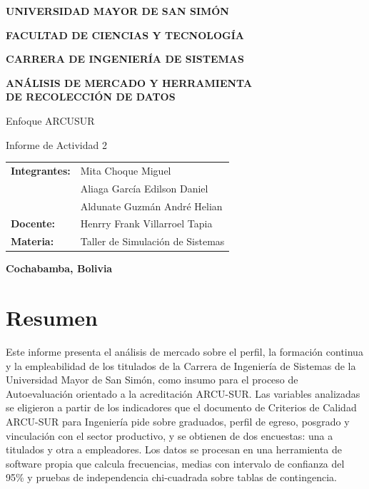 \documentclass[12pt, a4paper]{article}
\begin{document}


\setlength{\parindent}{0pt}

\begin{titlepage}
\centering
{\large\bfseries UNIVERSIDAD MAYOR DE SAN SIMÓN\par}
\vspace{4pt}
{\bfseries FACULTAD DE CIENCIAS Y TECNOLOGÍA\par}
\vspace{4pt}
{\bfseries CARRERA DE INGENIERÍA DE SISTEMAS\par}

\vspace*{\fill}
{\huge\bfseries ANÁLISIS DE MERCADO Y HERRAMIENTA\\DE RECOLECCIÓN DE DATOS\par}
\vspace{0.8cm}
{\Large Enfoque ARCUSUR\par}
\vspace{0.8cm}
{\normalsize Informe de Actividad 2\par}
\vspace*{\fill}

\begin{flushleft}
\begin{tabular}{@{}ll}
\textbf{Integrantes:} & Mita Choque Miguel \\[4pt]
                      & Aliaga García Edilson Daniel \\[4pt]
                      & Aldunate Guzmán André Helian \\[4pt]
\textbf{Docente:}     & Henrry Frank Villarroel Tapia \\[4pt]
\textbf{Materia:}     & Taller de Simulación de Sistemas \\
\end{tabular}
\end{flushleft}

\vspace{1.5cm}
{\bfseries Cochabamba, Bolivia\par}
\end{titlepage}

\tableofcontents
\listoftables
\newpage

\section*{Resumen}

Este informe presenta el análisis de mercado sobre el perfil, la
formación continua y la empleabilidad de los titulados de la Carrera de
Ingeniería de Sistemas de la Universidad Mayor de San Simón, como insumo
para el proceso de Autoevaluación orientado a la acreditación ARCU-SUR.
Las variables analizadas se eligieron a partir de los indicadores que el
documento de Criterios de Calidad ARCU-SUR para Ingeniería pide sobre
graduados, perfil de egreso, posgrado y vinculación con el sector
productivo, y se obtienen de dos encuestas: una a titulados y otra a
empleadores. Los datos se procesan en una herramienta de software
propia que calcula frecuencias, medias con intervalo de confianza del
95\% y pruebas de independencia chi-cuadrada sobre tablas de
contingencia. 
\end{document}
